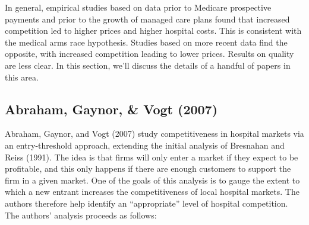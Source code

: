 \documentclass[
  letterpaper,
  DIV=11,
  numbers=noendperiod]{scrreport}
\theoremstyle{definition}
\theoremstyle{remark}
\begin{document}
In general, empirical studies based on data prior to Medicare
prospective payments and prior to the growth of managed care plans found
that increased competition led to higher prices and higher hospital
costs. This is consistent with the medical arms race hypothesis. Studies
based on more recent data find the opposite, with increased competition
leading to lower prices. Results on quality are less clear. In this
section, we'll discuss the details of a handful of papers in this area.

\hypertarget{abraham-gaynor-vogt-2007}{%
\subsection{Abraham, Gaynor, \& Vogt
(2007)}\label{abraham-gaynor-vogt-2007}}

Abraham, Gaynor, and Vogt (2007) study competitiveness in hospital
markets via an entry-threshold approach, extending the initial analysis
of Bresnahan and Reiss (1991). The idea is that firms will only enter a
market if they expect to be profitable, and this only happens if there
are enough customers to support the firm in a given market. One of the
goals of this analysis is to gauge the extent to which a new entrant
increases the competitiveness of local hospital markets. The authors
therefore help identify an ``appropriate'' level of hospital
competition. The authors' analysis proceeds as follows:
\end{document}
